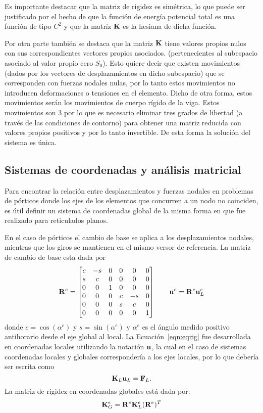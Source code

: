 Es importante destacar que la matriz de rigidez es simétrica, lo que puede ser justificado por el hecho de que la función de energía potencial total es una función de tipo $C^2$ y que la matríz ${\bf K}$ es la hesiana  de dicha función. %

Por otra parte también se destaca que la matriz ${\bf K}$ tiene valores propios nulos con sus correspondientes vectores propios asociados. %
(pertenecientes al subespacio asociado al valor propio cero $S_0$). %
%
Esto quiere decir que existen movimientos (dados por los vectores de desplazamientos en dicho subespacio) que se corresponden con fuerzas nodales nulas, por lo tanto estos movimientos no introducen deformaciones o tensiones en el elemento. %
%
Dicho de otra forma, estos movimientos serán los movimientos de cuerpo rígido de la viga. %
%
Estos movimientos son 3 por lo que es necesario eliminar tres grados de libertad (a través de las condiciones de contorno) para obtener una matriz reducida con valores propios positivos y por lo tanto invertible. %
%
De esta forma la solución del sistema es única.

\subsection{Sistemas de coordenadas y análisis matricial}

Para encontrar la relación entre desplazamientos y fuerzas nodales en problemas de pórticos donde los ejes de los elementos que concurren a un nodo no coinciden, es útil definir un sistema de coordenadas global de la misma forma en que fue realizado para reticulados planos.
%

En el caso de pórticos el cambio de base se aplica a los desplazamientos nodales, mientras que los giros se mantienen en el mismo versor de referencia. %
%
La matriz de cambio de base esta dada por
%
\begin{equation}
{\bf R}^e = 
\left[
\begin{matrix}
c & -s & 0 & 0 &  0 & 0 \\
s & c & 0 & 0 &  0 & 0\\
0 & 0 &1 & 0 &  0 & 0\\
0 & 0 &0  &   c & -s& 0\\
0 & 0 &0  &  s & c & 0\\
0 & 0 &0 & 0 &  0 & 1\\
\end{matrix}
\right]
\qquad
{\bf u}^e = {\bf R}^e {\bf u}^e_L
\end{equation}
%
donde $c=\cos(\alpha^e)$ y $s=\sin(\alpha^e)$ y $\alpha^e$ es el ángulo medido positivo antihorario desde el eje global al local. %
%
La Ecuación~\eqref{eqn:eqrig} fue desarrollada en coordenadas locales utilizando la notación ${\bf u}$, la cual en el caso de sistemas coordenadas locales y globales correspondería a los ejes locales, por lo que debería ser escrita como
\begin{equation}
{\bf K}_L {\bf u}_L = {\bf F}_L.
\end{equation}
%
La matriz de rigidez en coordenadas globales está dada por:
\begin{equation}
{\bf K}^e_G = {\bf R}^e {\bf K}^e_L ({\bf R}^e)^T
\end{equation}


